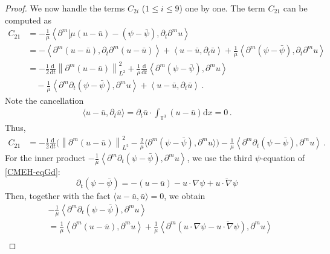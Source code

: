 \documentclass[10pt,a4paper]{amsart}
\def\d{\mathrm{d}}
\def\p{\partial}
\begin{document}
\begin{proof}
We now handle the terms $C_{2i}$ ($1 \le i \le 9$) one by one. The term $C_{21}$ can be computed as
\begin{align*}
C_{21} &  = -\frac{1}{\mu} \left\langle \partial^m [\mu(u-\bar{u}) -(\psi-\bar{\psi}), \partial_t \partial^m u \right\rangle \\
& = -\left\langle \partial^m (u-\bar{u}), \partial_t \partial^m (u-\bar{u}) \right\rangle + \left\langle u-\bar{u}, \partial_t \bar{u} \right\rangle + \frac{1}{\mu} \left\langle \partial^m (\psi-\bar{\psi}), \partial_t \partial^m u \right\rangle \\
&= -\frac{1}{2} \frac{\d}{\d t} \left\| \partial^m (u-\bar{u}) \right\|_{L^2}^2 + \frac{1}{\mu} \frac{\d}{\d t} \left\langle \partial^m (\psi-\bar{\psi}), \partial^m u \right\rangle \\
&\quad -\frac{1}{\mu} \left\langle \partial^m \partial_t (\psi-\bar{\psi}), \partial^m u \right\rangle + \left\langle u-\bar{u}, \partial_t \bar{u} \right\rangle \,.
\end{align*}
Note the cancellation
\begin{equation*}
\begin{aligned}
\langle u-\bar{u},\p_t \bar{u} \rangle=\p_t\bar{u}\cdot \int_{\mathbb{T}^3}{(u-\bar{u})}\d x=0 \,.
\end{aligned}
\end{equation*}
Thus,
\begin{equation*}
\begin{aligned}
C_{21}&=-\frac{1}{2} \frac{\d}{\d t}\big( \left\| \partial^m (u-\bar{u}) \right\|_{L^2}^2 - \frac{2}{\mu}\langle \partial^m (\psi-\bar{\psi}), \partial^m u \rangle\big) -\frac{1}{\mu} \left\langle \partial^m \partial_t (\psi-\bar{\psi}), \partial^m u \right\rangle \,.
\end{aligned}
\end{equation*}
For the inner product $-\frac{1}{\mu} \left\langle \partial^m \partial_t (\psi-\bar{\psi}), \partial^m u \right\rangle$, we use the third $\psi$-equation of \eqref{CMEH-eqGd}: 
$$
\partial_t \left( \psi - \bar{\psi} \right) = - \left( u - \bar{u} \right) - u \cdot \nabla \psi + \bar{u \cdot \nabla \psi}$$
Then, together with the fact $\langle u-\bar{u},\bar{u}\rangle=0$, we obtain
\begin{align*}
&-\frac{1}{\mu} \left\langle \partial^m \partial_t \left( \psi - \bar{\psi} \right), \partial^m u \right\rangle \\
&= \frac{1}{\mu} \left\langle \partial^m (u - \bar{u}), \partial^m u \right\rangle + \frac{1}{\mu} \left\langle \partial^m \left( u \cdot \nabla \psi -\overline{u \cdot \nabla \psi} \right), \partial^m u \right\rangle \\

\end{align*}
\end{proof}
\end{document}
